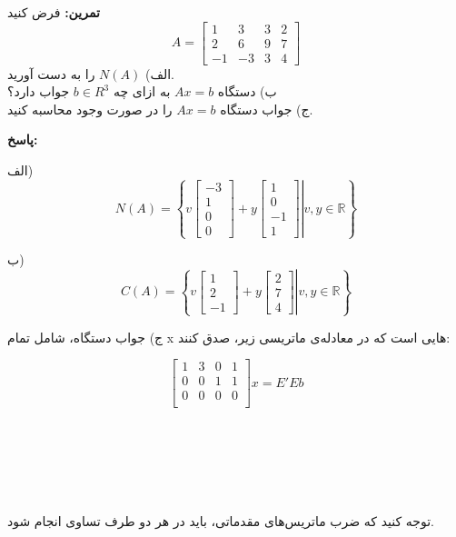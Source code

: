 \textbf{تمرین:}
فرض کنید
$$A=\begin{bmatrix}
1&3&3&2\\
2&6&9&7\\
-1&-3&3&4
\end{bmatrix}$$
الف) $N(A)$ را به دست آورید.\\
ب) دستگاه $Ax=b$ به ازای چه $b\in R^3$ جواب دارد؟\\
ج) جواب دستگاه $Ax=b$ را در صورت وجود محاسبه کنید.

\textbf{پاسخ:}

الف) 
$$N(A)=\left\{\left.v
\begin{bmatrix}
	-3\\1\\0\\0
\end{bmatrix} + y
\begin{bmatrix}
	1\\0\\-1\\1
\end{bmatrix}\right|  v, y \in \mathbb{R}\right\}
$$

ب) 
$$C(A)=\left\{\left.v
\begin{bmatrix}
1\\2\\-1
\end{bmatrix} + y
\begin{bmatrix}
2\\7\\4
\end{bmatrix}\right|  v, y \in \mathbb{R}\right\}
$$

ج) جواب دستگاه، شامل تمام x هایی است که در معادله‌ی ماتریسی زیر، صدق کنند:

$$
\begin{bmatrix}
1 & 3 & 0 & 1 \\
0 & 0 & 1 & 1 \\
0 & 0 & 0 & 0 \\
\end{bmatrix} x = E' E b
$$

\vspace{20pt}

‌

‌

‌

توجه کنید که ضرب ماتریس‌های مقدماتی، باید در هر دو طرف تساوی انجام شود.